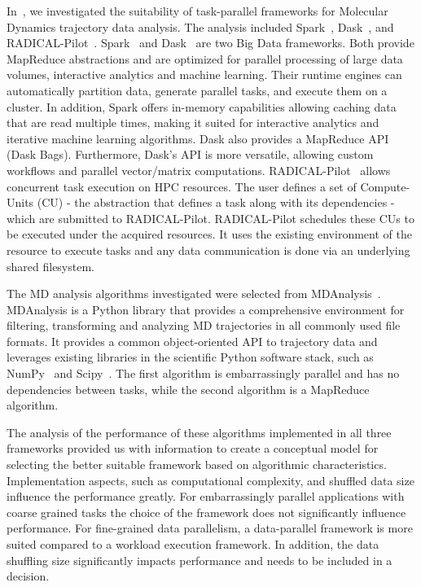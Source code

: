 {In~\cite{paraskevakos2018task}, we investigated the suitability of task-parallel 
frameworks for Molecular Dynamics trajectory data analysis. The analysis included 
Spark~\cite{zaharia2010spark}, Dask~\cite{rocklin2015dask}, and RADICAL-Pilot~\cite{merzky2019using}. 
Spark~\cite{zaharia2010spark} and Dask~\cite{rocklin2015dask} are two Big Data 
frameworks. Both provide MapReduce abstractions and are optimized for parallel 
processing of large data volumes, interactive analytics and machine learning. Their 
runtime engines can automatically partition data, generate parallel tasks, and 
execute them on a cluster. In addition, Spark offers in-memory capabilities allowing 
caching data that are read multiple times, making it suited for interactive 
analytics and iterative machine learning algorithms. Dask also provides a MapReduce 
API (Dask Bags). Furthermore, Dask’s API is more versatile, allowing custom 
workflows and parallel vector/matrix computations. RADICAL-Pilot~\cite{merzky2019using} 
allows concurrent task execution on HPC resources. The user defines a set of 
Compute-Units (CU) - the abstraction that defines a task along with its dependencies - 
which are submitted to RADICAL-Pilot. RADICAL-Pilot schedules these CUs to be 
executed under the acquired resources. It uses the existing environment of the 
resource to execute tasks and any data communication is done via an underlying 
shared filesystem.

The MD analysis algorithms investigated were selected from MDAnalysis~\cite{gowers2016mdanalysis,michaud2011mdanalysis}.
 MDAnalysis is a Python library that provides a comprehensive environment for 
 filtering, transforming and analyzing MD trajectories in all commonly used file 
 formats. It provides a common object-oriented API to trajectory data and leverages 
 existing libraries in the scientific Python software stack, such as NumPy~\cite{numpy} 
 and Scipy~\cite{scipy}. The first algorithm is embarrassingly parallel and has 
 no dependencies between tasks, while the second algorithm is a MapReduce 
 algorithm.

The analysis of the performance of these algorithms implemented in all three 
frameworks provided us with information to create a conceptual model for selecting 
the better suitable framework based on algorithmic characteristics. Implementation 
aspects, such as computational complexity, and shuffled data size influence the 
performance greatly. For embarrassingly parallel applications with coarse grained 
tasks the choice of the framework does not significantly influence performance. 
For fine-grained data parallelism, a data-parallel framework is more suited compared 
to a workload execution framework. In addition, the data shuffling size significantly 
impacts performance and needs to be included in a decision.

}
